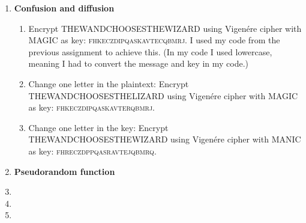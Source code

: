 \documentclass{article}
\begin{document}
	\homeworktitle
	
	\begin{enumerate}[label=\textbf{Task \arabic*:}]
		\item \textbf{Confusion and diffusion}
		\begin{enumerate}[label=\textit{Part \roman*:}]
			\item Encrypt \textsc{THEWANDCHOOSESTHEWIZARD} using Vigenére cipher with \textsc{MAGIC} as key: \textsc{fhkeczdipqaskavtecqbmrj}. I used my code from the previous assignment to achieve this. (In my code I used lowercase, meaning I had to convert the message and key in my code.)
			
			\item Change one letter in the plaintext: Encrypt \textsc{THEWANDCHOOSESTHELIZARD} using Vigenére cipher with \textsc{MAGIC} as key: \textsc{fhkeczdipqaskavterqbmrj}. 
			
			\item Change one letter in the key: Encrypt \textsc{THEWANDCHOOSESTHEWIZARD} using Vigenére cipher with \textsc{MANIC} as key: \textsc{fhreczdppqasravtejqbmrq}.
			
		\end{enumerate}
		\item \textbf{Pseudorandom function}
		\item 
		\item 
		\item 
	\end{enumerate}
	
\end{document}
